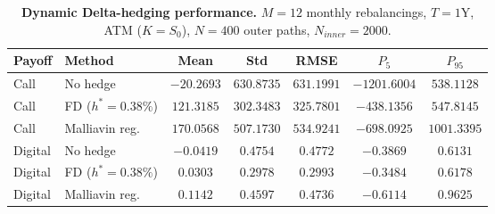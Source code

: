 \begin{table}[h!]\centering
\begin{tabular}{llccccc}\toprule
Payoff & Method & Mean & Std & RMSE & $P_5$ & $P_{95}$ \\\midrule
Call & No hedge & $-20.2693$ & $630.8735$ & $631.1991$ & $-1201.6004$ & $538.1128$ \\
Call & FD ($h^*=0.38\%$) & $121.3185$ & $302.3483$ & $325.7801$ & $-438.1356$ & $547.8145$ \\
Call & Malliavin reg. & $170.0568$ & $507.1730$ & $534.9241$ & $-698.0925$ & $1001.3395$ \\
Digital & No hedge & $-0.0419$ & $0.4754$ & $0.4772$ & $-0.3869$ & $0.6131$ \\
Digital & FD ($h^*=0.38\%$) & $0.0303$ & $0.2978$ & $0.2993$ & $-0.3484$ & $0.6178$ \\
Digital & Malliavin reg. & $0.1142$ & $0.4597$ & $0.4736$ & $-0.6114$ & $0.9625$ \\
\bottomrule\end{tabular}
\caption{\textbf{Dynamic Delta-hedging performance.} $M=12$ monthly rebalancings, $T=1$Y, ATM ($K=S_0$), $N=400$ outer paths, $N_{inner}=2000$.}
\label{tab:hedging_performance}\end{table}